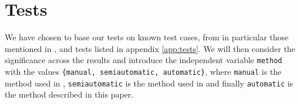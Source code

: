 \documentclass[10pt,letterpaper,final]{article}
\begin{document}








\section{Tests}
\label{chap:test}
We have chosen to base our tests on known test cases, from in particular
those mentioned in \cite{jensenandersen}, \cite{googlingdiagnosis} and
tests listed in appendix \ref{app:tests}. We will then consider the
significance across the results and introduce the independent variable
\texttt{method} with the values \texttt{\{manual, semiautomatic,
automatic\}}, where \texttt{manual} is the method used in
\cite{googlingdiagnosis}, \texttt{semiautomatic} is the method used in
\cite{jensenandersen} and finally \texttt{automatic} is the method
described in this paper.
\end{document}
